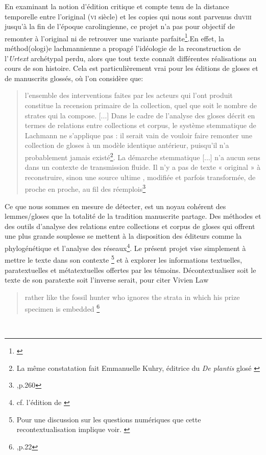 \documentclass[a4paper, twoside, 12pt]{book}
\begin{document}
En examinant la notion d'édition critique et compte tenu de la distance temporelle entre l'original (\textsc{vi}\ieme{} siècle) et les copies qui nous sont parvenus du\textsc{viii}\ieme{} jusqu'à la fin de l'époque carolingienne, ce projet n'a pas pour objectif de remonter à l'original ni de retrouver une variante parfaite\footnote{\cite{cerquiglini1990eloge}}.En effet, la méthod(ologi)e lachmannienne a propagé l'idéologie de la reconstruction de l'\textit{Urtext} archétypal perdu, alors que tout texte connaît différentes réalisations au cours de son histoire.  Cela est particulièrement vrai pour les éditions de gloses et de manuscrits glossés, où l'on considère que:
\blockquote{l’ensemble des interventions faites par les acteurs qui l’ont produit constitue la recension primaire de la collection, quel que soit le nombre de strates qui la compose. [...] Dans le cadre de l’analyse des gloses décrit en termes de relations entre collections et corpus, le système stemmatique de Lachmann ne s’applique pas : il serait vain de vouloir faire remonter une collection de gloses à un modèle identique antérieur, puisqu’il n’a probablement jamais existé\footnote{La même constatation fait Emmanuelle Kuhry, éditrice du \textit{De plantis} glosé \cite{kuhry2020medieval}}. La démarche stemmatique [...] n'a aucun sens dans un contexte de transmission fluide. Il n’y a pas de texte « original » à reconstruire, sinon une source \og{} ultime \fg{}, modifiée et parfois transformée, de proche en proche, au fil des réemplois\footnote{\cite{cinato2015priscien},p.260}}. 
Ce que nous sommes en mesure de détecter, est un noyau cohérent des lemmes/gloses que la totalité de la tradition manuscrite partage. Des méthodes et des outils d'analyse des relations entre collections et corpus de gloses qui offrent une plus grande souplesse se mettent à la disposition des éditeurs comme la phylogénétique et l'analyse des réseaux\footnote{cf. l'édition de \cite{steinova2021glosses}}. Le présent projet vise  simplement à mettre le texte dans son contexte \footnote{Pour une discussion sur les questions numériques que cette recontextualisation implique voir. \cite{pierazzo2011putting}} et à explorer les informations textuelles, paratextuelles et métatextuelles offertes par les témoins. Décontextualiser soit le texte de son paratexte soit l'inverse serait, pour citer Vivien Law \blockquote{rather like the fossil hunter who ignores the strata in which his prize specimen is embedded \footnote{\cite{law1997grammar},p.22}}.\\
\end{document}
